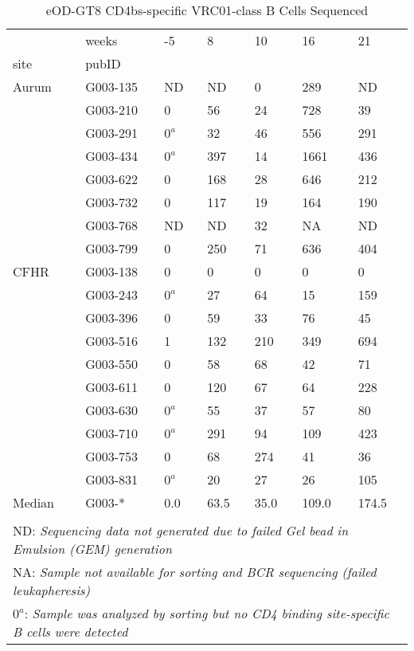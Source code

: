 \documentclass{article}
\begin{document}
    \begin{table}
\centering
\caption{eOD-GT8 CD4bs-specific VRC01-class B Cells Sequenced}
\begin{tabular}{lllllll}
\toprule
       & weeks &     -5 &     8 &    10 &     16 &     21 \\
site & pubID &        &       &       &        &        \\
\midrule
Aurum & G003-135 &  ND &  ND &  0 &  289 &  ND \\
       & G003-210 &  0 &  56 &  24 &  728 &  39 \\
       & G003-291 &  $0^a$ &  32 &  46 &  556 &  291 \\
       & G003-434 &  $0^a$ &  397 &  14 &  1661 &  436 \\
       & G003-622 &  0 &  168 &  28 &  646 &  212 \\
       & G003-732 &  0 &  117 &  19 &  164 &  190 \\
       & G003-768 &  ND &  ND &  32 &  NA &  ND \\
       & G003-799 &  0 &  250 &  71 &  636 &  404 \\
\midrule
CFHR & G003-138 &  0 &  0 &  0 &  0 &  0 \\
       & G003-243 &  $0^a$ &  27 &  64 &  15 &  159 \\
       & G003-396 &  0 &  59 &  33 &  76 &  45 \\
       & G003-516 &  1 &  132 &  210 &  349 &  694 \\
       & G003-550 &  0 &  58 &  68 &  42 &  71 \\
       & G003-611 &  0 &  120 &  67 &  64 &  228 \\
       & G003-630 &  $0^a$ &  55 &  37 &  57 &  80 \\
       & G003-710 &  $0^a$ &  291 &  94 &  109 &  423 \\
       & G003-753 &  0 &  68 &  274 &  41 &  36 \\
       & G003-831 &  $0^a$ &  20 &  27 &  26 &  105 \\
\midrule
Median & G003-* &  0.0 &  63.5 &  35.0 &  109.0 &  174.5 \\
\bottomrule
\multicolumn{7}{l}{\tiny } \\
\multicolumn{7}{l}{\tiny ND: \textit{Sequencing data not generated due to failed Gel bead in Emulsion (GEM) generation}} \\
\multicolumn{7}{l}{\tiny NA: \textit{Sample not available for sorting and BCR sequencing (failed leukapheresis)}} \\
\multicolumn{7}{l}{\tiny $0^a$: \textit{Sample was analyzed by sorting but no CD4 binding site-specific B cells were detected}} \\
\end{tabular}
\end{table}
\end{document}
